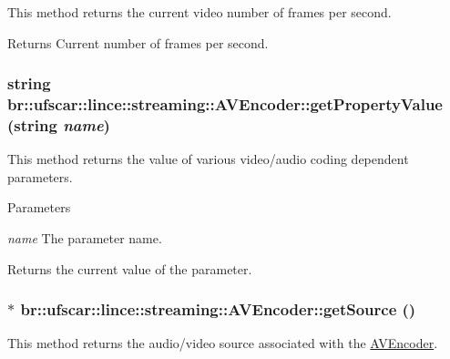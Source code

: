 This method returns the current video number of frames per second. 

\begin{DoxyReturn}{Returns}
Current number of frames per second. 
\end{DoxyReturn}
\hypertarget{classbr_1_1ufscar_1_1lince_1_1streaming_1_1AVEncoder_a79f96fe18d52c9e4b622977165cc228a}{
\subsubsection[{getPropertyValue}]{\setlength{\rightskip}{0pt plus 5cm}string br::ufscar::lince::streaming::AVEncoder::getPropertyValue (string {\em name})}}
\label{classbr_1_1ufscar_1_1lince_1_1streaming_1_1AVEncoder_a79f96fe18d52c9e4b622977165cc228a}


This method returns the value of various video/audio coding dependent parameters. 


\begin{DoxyParams}{Parameters}
\item[{\em name}]The parameter name. \end{DoxyParams}
\begin{DoxyReturn}{Returns}
the current value of the parameter. 
\end{DoxyReturn}
\hypertarget{classbr_1_1ufscar_1_1lince_1_1streaming_1_1AVEncoder_adf111dba6e608b6e3ea20cee5252a6a6}{
\subsubsection[{getSource}]{$\ast$ br::ufscar::lince::streaming::AVEncoder::getSource ()}}
\label{classbr_1_1ufscar_1_1lince_1_1streaming_1_1AVEncoder_adf111dba6e608b6e3ea20cee5252a6a6}


This method returns the audio/video source associated with the \hyperlink{classbr_1_1ufscar_1_1lince_1_1streaming_1_1AVEncoder}{AVEncoder}. 

